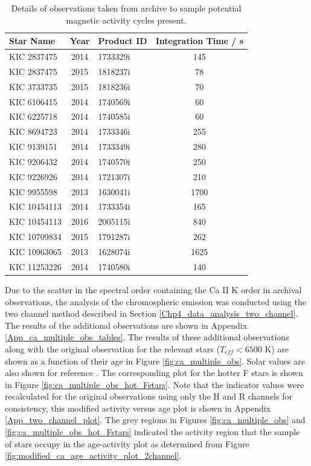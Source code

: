 \begin{table}
\centering
\begin{tabular}{lclc}
\hline
Star Name    & Year & Product ID & Integration Time / s \\
\hline
KIC 2837475  & 2014 & 1733329i   & 145                  \\
KIC 2837475  & 2015 & 1818237i   & 78                   \\
KIC 3733735  & 2015 & 1818236i   & 70                   \\
KIC 6106415  & 2014 & 1740569i   & 60                   \\
KIC 6225718  & 2014 & 1740585i   & 60                   \\
KIC 8694723  & 2014 & 1733346i   & 255                  \\
KIC 9139151  & 2014 & 1733349i   & 280                  \\
KIC 9206432  & 2014 & 1740570i   & 250                  \\
KIC 9226926  & 2014 & 1721307i   & 210                  \\
KIC 9955598  & 2013 & 1630041i   & 1700                 \\
KIC 10454113 & 2014 & 1733354i   & 165                  \\
KIC 10454113 & 2016 & 2005115i   & 840                  \\
KIC 10709834 & 2015 & 1791287i   & 262                  \\
KIC 10963065 & 2013 & 1628074i   & 1625                 \\
KIC 11253226 & 2014 & 1740580i   & 140					\\
\hline
\end{tabular}
\caption{Details of observations taken from \esp archive to sample potential magnetic activity cycles present.}
\label{Table:esp_additional_obs_table}
\end{table}

Due to the scatter in the spectral order containing the Ca II K order in archival observations, the analysis of the chromospheric emission was conducted using the two channel method described in Section \ref{Chp4_data_analysis_two_channel}. The results of the additional observations are shown in Appendix \ref{App_ca_multiple_obs_tables}. The results of these additional observations along with the original observation for the relevant stars ($T_{eff} < 6500$ K) are shown as a function of their age in Figure \ref{fig:ca_multiple_obs}. Solar values are also shown for reference \citep{Egeland_etal_2017}. The corresponding plot for the hotter F stars is shown in Figure \ref{fig:ca_multiple_obs_hot_Fstars}. Note that the \Rprime indicator values were recalculated for the original observations using only the H and R channels for consistency, this modified activity versus age plot is shown in Appendix \ref{App_two_channel_plot}. The grey regions in Figures \ref{fig:ca_multiple_obs} and \ref{fig:ca_multiple_obs_hot_Fstars} indicated the activity region that the sample of stars occupy in the age-activity plot as determined from Figure \ref{fig:modified_ca_age_activity_plot_2channel}.

